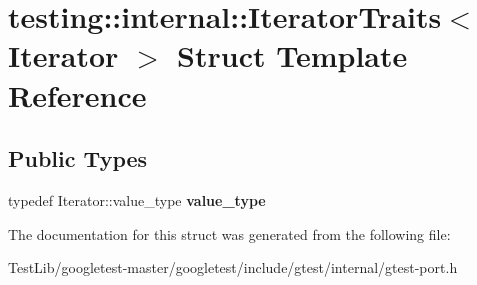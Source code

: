 \hypertarget{structtesting_1_1internal_1_1IteratorTraits}{}\section{testing\+:\+:internal\+:\+:Iterator\+Traits$<$ Iterator $>$ Struct Template Reference}
\label{structtesting_1_1internal_1_1IteratorTraits}
\subsection*{Public Types}
\begin{DoxyCompactItemize}
\item 
\mbox{\label{structtesting_1_1internal_1_1IteratorTraits_a29de4320a9c53ce438d3561b94e515bb}} 
typedef Iterator\+::value\+\_\+type {\bfseries value\+\_\+type}
\end{DoxyCompactItemize}


The documentation for this struct was generated from the following file\+:\begin{DoxyCompactItemize}
\item 
Test\+Lib/googletest-\/master/googletest/include/gtest/internal/gtest-\/port.\+h\end{DoxyCompactItemize}
